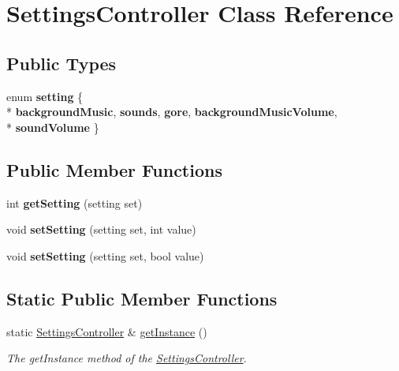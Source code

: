 \hypertarget{class_settings_controller}{\section{Settings\+Controller Class Reference}
\label{class_settings_controller}
}
\subsection*{Public Types}
\begin{DoxyCompactItemize}
\item 
\hypertarget{class_settings_controller_a757d865f9b5d8fa3f4d96048d698e03c}{enum {\bfseries setting} \{ \\*
{\bfseries background\+Music}, 
{\bfseries sounds}, 
{\bfseries gore}, 
{\bfseries background\+Music\+Volume}, 
\\*
{\bfseries sound\+Volume}
 \}}\label{class_settings_controller_a757d865f9b5d8fa3f4d96048d698e03c}

\end{DoxyCompactItemize}
\subsection*{Public Member Functions}
\begin{DoxyCompactItemize}
\item 
\hypertarget{class_settings_controller_a5fa15bf7c80e861b82bd82e0a56b6556}{int {\bfseries get\+Setting} (setting set)}\label{class_settings_controller_a5fa15bf7c80e861b82bd82e0a56b6556}

\item 
\hypertarget{class_settings_controller_ac02e8998adc861f887dc72c4d682b4ae}{void {\bfseries set\+Setting} (setting set, int value)}\label{class_settings_controller_ac02e8998adc861f887dc72c4d682b4ae}

\item 
\hypertarget{class_settings_controller_a71259292684df0732543ec3ea23ce61f}{void {\bfseries set\+Setting} (setting set, bool value)}\label{class_settings_controller_a71259292684df0732543ec3ea23ce61f}

\end{DoxyCompactItemize}
\subsection*{Static Public Member Functions}
\begin{DoxyCompactItemize}
\item 
static \hyperlink{class_settings_controller}{Settings\+Controller} \& \hyperlink{class_settings_controller_a5f01530df4d82ba540c904cae8ed44d5}{get\+Instance} ()
\begin{DoxyCompactList}\small\item\em The get\+Instance method of the \hyperlink{class_settings_controller}{Settings\+Controller}. \end{DoxyCompactList}\end{DoxyCompactItemize}


